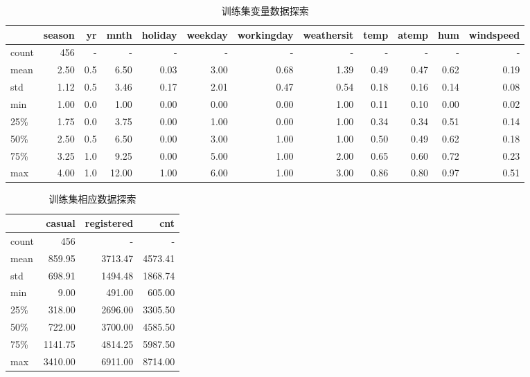 \begin{table}[htbp]
    \centering\tiny
    \begin{tabular}{lrrrrrrrrrrr}
    \toprule
    {} &  season &     yr &    mnth &  holiday &  weekday &  workingday &  weathersit &    temp &   atemp &     hum &  windspeed \\
    \midrule
    count &  456 &  -  &   -  &   -  &   -  &   -  &   -  &   -  &   -  &   -  &   -  \\
    mean  & 2.50 & 0.5 & 6.50 & 0.03 & 3.00 & 0.68 & 1.39 & 0.49 & 0.47 & 0.62 & 0.19 \\
    std   & 1.12 & 0.5 & 3.46 & 0.17 & 2.01 & 0.47 & 0.54 & 0.18 & 0.16 & 0.14 & 0.08 \\
    min   & 1.00 & 0.0 & 1.00 & 0.00 & 0.00 & 0.00 & 1.00 & 0.11 & 0.10 & 0.00 & 0.02 \\
    25\%  & 1.75 & 0.0 & 3.75 & 0.00 & 1.00 & 0.00 & 1.00 & 0.34 & 0.34 & 0.51 & 0.14 \\
    50\%  & 2.50 & 0.5 & 6.50 & 0.00 & 3.00 & 1.00 & 1.00 & 0.50 & 0.49 & 0.62 & 0.18 \\
    75\%  & 3.25 & 1.0 & 9.25 & 0.00 & 5.00 & 1.00 & 2.00 & 0.65 & 0.60 & 0.72 & 0.23 \\
    max   & 4.00 & 1.0 &12.00 & 1.00 & 6.00 & 1.00 & 3.00 & 0.86 & 0.80 & 0.97 & 0.51 \\
    \bottomrule
    \end{tabular}
    \cprotect\caption{训练集变量数据探索}\label{T:train-day_x-data}
\end{table}

\begin{table}[htbp]
    \centering\tiny
    \begin{tabular}{lrrr}
    \toprule
    {}    &  casual & registered &  cnt \\
    \midrule
    count &    456  &     -   &     -   \\
    mean  &  859.95 & 3713.47 & 4573.41 \\
    std   &  698.91 & 1494.48 & 1868.74 \\
    min   &    9.00 &  491.00 &  605.00 \\
    25\%  &  318.00 & 2696.00 & 3305.50 \\
    50\%  &  722.00 & 3700.00 & 4585.50 \\
    75\%  & 1141.75 & 4814.25 & 5987.50 \\
    max   & 3410.00 & 6911.00 & 8714.00 \\
    \bottomrule
    \end{tabular}
    \cprotect\caption{训练集相应数据探索}\label{T:train-day_y-data}
\end{table}

